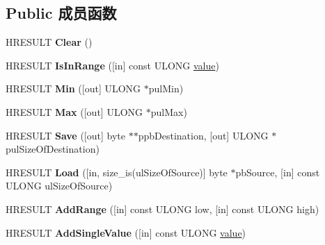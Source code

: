 \subsection*{Public 成员函数}
\begin{DoxyCompactItemize}
\item 
\mbox{\label{interface_i_range_list_aebeb37ba50c5870f6d5bbf853b83f2cf}} 
H\+R\+E\+S\+U\+LT {\bfseries Clear} ()
\item 
\mbox{\label{interface_i_range_list_acc57d4a771b9cef60278cd394530a438}} 
H\+R\+E\+S\+U\+LT {\bfseries Is\+In\+Range} (\mbox{[}in\mbox{]} const U\+L\+O\+NG \hyperlink{unionvalue}{value})
\item 
\mbox{\label{interface_i_range_list_ab5591f40db3c1497f378d66725897d7b}} 
H\+R\+E\+S\+U\+LT {\bfseries Min} (\mbox{[}out\mbox{]} U\+L\+O\+NG $\ast$pul\+Min)
\item 
\mbox{\label{interface_i_range_list_aa57878a30e4c1be59d5107d6f4eb805c}} 
H\+R\+E\+S\+U\+LT {\bfseries Max} (\mbox{[}out\mbox{]} U\+L\+O\+NG $\ast$pul\+Max)
\item 
\mbox{\label{interface_i_range_list_a494cdec5daceb90fb0553caeb3eda502}} 
H\+R\+E\+S\+U\+LT {\bfseries Save} (\mbox{[}out\mbox{]} byte $\ast$$\ast$ppb\+Destination, \mbox{[}out\mbox{]} U\+L\+O\+NG $\ast$pul\+Size\+Of\+Destination)
\item 
\mbox{\label{interface_i_range_list_a31095d16d26fa85ea1aeb3c0714ca4e0}} 
H\+R\+E\+S\+U\+LT {\bfseries Load} (\mbox{[}in, size\+\_\+is(ul\+Size\+Of\+Source)\mbox{]} byte $\ast$pb\+Source, \mbox{[}in\mbox{]} const U\+L\+O\+NG ul\+Size\+Of\+Source)
\item 
\mbox{\label{interface_i_range_list_a80303f71c847b52b94c2d73f14214aba}} 
H\+R\+E\+S\+U\+LT {\bfseries Add\+Range} (\mbox{[}in\mbox{]} const U\+L\+O\+NG low, \mbox{[}in\mbox{]} const U\+L\+O\+NG high)
\item 
\mbox{\label{interface_i_range_list_a51e329364c2ca587ce72675eee02fda3}} 
H\+R\+E\+S\+U\+LT {\bfseries Add\+Single\+Value} (\mbox{[}in\mbox{]} const U\+L\+O\+NG \hyperlink{unionvalue}{value})
$$
\end{DoxyCompactItemize}
